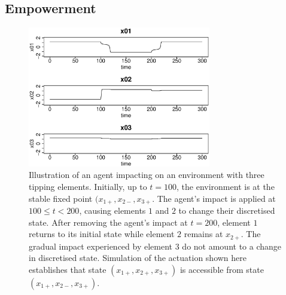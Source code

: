 \documentclass[conference]{IEEEtran}
\begin{document}
\subsection{Empowerment}
\label{section_empowerment}

\begin{figure}

  \centerline{\includegraphics[width=8cm]{agentimpact_ode.eps}}

  \caption{Illustration of an agent impacting on an environment with
    three tipping elements. Initially, up to $t = 100$, the
    environment is at the stable fixed point $(x_{1+}, x_{2-}, x_{3+}$. The agent's impact is
    applied at $100 \le t < 200$, causing elements $1$ and $2$ to change
    their discretised state. After removing the agent's impact at $t =
    200$, element $1$ returns to its initial state while element $2$
    remains at $x_{2+}$. The gradual impact experienced by element $3$
    do not amount to a change in discretised state. Simulation of the
    actuation shown here establishes that state $(x_{1+}, x_{2+},
    x_{3+})$ is accessible from state $(x_{1+}, x_{2-}, x_{3+})$.}
  \label{fig_agentimpact}
\end{figure}


\end{document}

